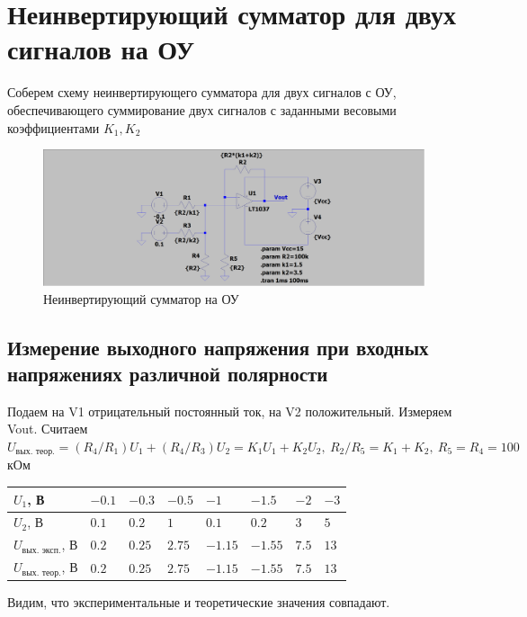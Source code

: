 \documentclass[a4paper, 12pt]{article}
\begin{document}
    \section{Неинвертирующий сумматор для двух сигналов на ОУ}
    Соберем схему неинвертирующего сумматора для двух сигналов с ОУ,
    обеспечивающего суммирование двух сигналов с заданными весовыми
    коэффициентами $K_1,K_2$
    \begin{figure}[H]
        \centering
        \includegraphics[scale=0.22]{scheme5.png}
        \captionsetup{skip=0pt}
        \caption{Неинвертирующий сумматор на ОУ}
        \label{fig:scheme5}
    \end{figure}


    \subsection{Измерение выходного напряжения при входных напряжениях различной полярности}
    Подаем на V1 отрицательный постоянный ток, на V2 положительный. Измеряем Vout. Считаем
    $U_{\text{вых. теор.}}=\left(R_4/R_1\right)U_1+\left(R_4/R_3\right)U_2=K_1U_1+K_2U_2,\ R_2/R_5=K_1+K_2,\ R_5=R_4=100$ кОм
    \begin{center}
        \begin{tabular}{ | m{6em} | m{3em}| m{3em} | m{3em} | m{3em} | m{3em} | m{3em} | m{3em} | } 
        \hline
        $U_1$, В& $-0.1$ &$-0.3$ &$-0.5$ &$-1$& $-1.5$ & $-2$ & $-3$\\ 
        \hline
        $U_2$, В& $0.1$ &$0.2$ &$1$ &$0.1$& $0.2$ & $3$ &$5$\\ 
        \hline
        $U_{\text{вых. эксп.}}$, В& $0.2$ &$0.25$ &$2.75$ &$-1.15$& $-1.55$ & $7.5$ &$13$\\
        \hline
        $U_{\text{вых. теор.}}$, В& $0.2$ &$0.25$ &$2.75$ &$-1.15$& $-1.55$ & $7.5$& $13$\\
        \hline
        \end{tabular}
    \end{center}
    Видим, что экспериментальные и теоретические значения совпадают.
\end{document}
